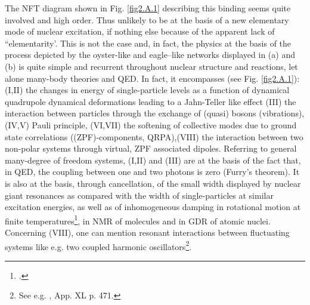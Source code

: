 The NFT diagram shown in Fig. \ref{fig2.A.1} describing this binding seems quite involved and high order. Thus unlikely to be at the basis of a new elementary mode of nuclear excitation, if nothing else because of the apparent lack of ``elementarity'. This is not the case and, in fact, the physics at the basis of the process depicted by the oyster-like and eagle--like networks displayed in (a) and (b) is quite simple and recurrent throughout nuclear structure and reactions, let alone many-body theories and QED. In fact, it encompasses (see Fig. \ref{fig2.A.1}): (I,II) the changes in energy of single-particle levels as a function of dynamical quadrupole dynamical deformations leading to a Jahn-Teller like effect (III) the interaction between particles through the exchange of (quasi) bosons (vibrations), (IV,V) Pauli principle, (VI,VII) the softening of collective modes due to ground state correlations ((ZPF)-components, QRPA),(VIII) the interaction between two non-polar systems through virtual, ZPF associated dipoles. Referring to general many-degree of freedom systems, (I,II) and (III) are at the basis of the fact that, in QED, the coupling between one and two photons is zero (Furry's theorem). It is also at the basis, through cancellation, of the small width displayed by nuclear giant resonances as compared with the  width of single-particles at  similar excitation energies, as well as of inhomogeneous damping in rotational motion at finite temperatures\footnote{\cite{Broglia:87}.}, in NMR of molecules  and in GDR of atomic nuclei. Concerning (VIII), one can mention resonant interactions between fluctuating systems like e.g. two coupled harmonic oscillators\footnote{See e.g. \cite{Born:69}, App. XL p. 471.}. 


